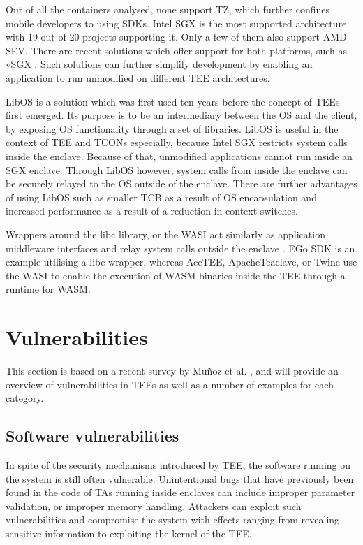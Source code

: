 \documentclass[runningheads,a4paper]{uwsese}
\begin{document}
Out of all the containers analysed, none support \gls{TZ}, which further
confines mobile developers to using \glspl{SDK}. Intel SGX is the most supported
architecture with 19 out of 20 projects supporting it. Only a few of them also
support AMD SEV. There are recent solutions which offer support for both
platforms, such as vSGX \cite{vsgx}. Such solutions can further simplify
development by enabling an application to run unmodified on different \gls{TEE}
architectures.

LibOS \cite{libos} is a solution which was first used ten years before the
concept of \glspl{TEE} first emerged. Its purpose is to be an intermediary
between the OS and the client, by exposing OS functionality through a set of
libraries. LibOS is useful in the context of \gls{TEE} and \glspl{TCON}
especially, because Intel SGX restricts system calls inside the enclave.
Because of that, unmodified applications cannot run inside an SGX enclave.
Through LibOS however, system calls from inside the enclave can be securely
relayed to the OS outside of the enclave. There are further advantages of using
LibOS such as smaller \gls{TCB} as a result of OS encapsulation and increased
performance as a result of a reduction in context switches.

Wrappers around the libc library, or the \gls{WASI} act similarly as
application middleware interfaces and relay system calls outside the enclave
\cite{understanding}. EGo SDK is an example utilising a libc-wrapper, whereas
AccTEE, ApacheTeaclave, or Twine use the \gls{WASI} to enable the execution of
\gls{WASM} binaries inside the \gls{TEE} through a runtime for \gls{WASM}.



\section{Vulnerabilities}

This section is based on a recent survey by Muñoz et al.
\cite{tee_in_securities}, and will provide an overview of vulnerabilities in
\glspl{TEE} as well as a number of examples for each category.

\subsection{Software vulnerabilities}

In spite of the security mechanisms introduced by \gls{TEE}, the software
running on the system is still often vulnerable. Unintentional bugs that have
previously been found in the code of \glspl{TA} running inside enclaves can
include improper parameter validation, or improper memory handling. Attackers
can exploit such vulnerabilities and compromise the system with effects ranging
from revealing sensitive information to exploiting the kernel of the \gls{TEE}.
\end{document}
